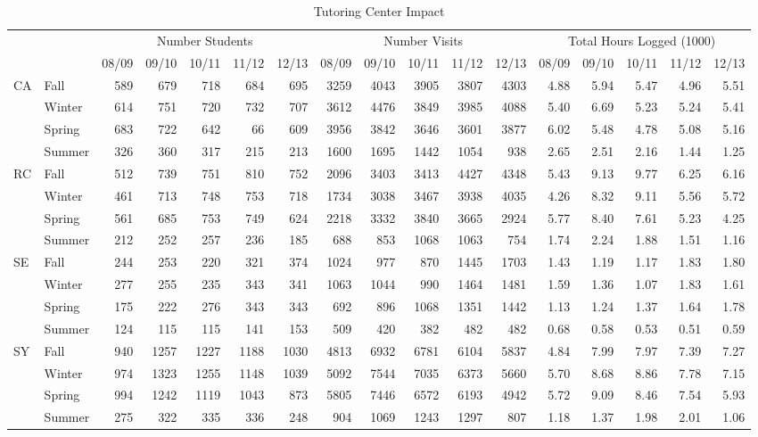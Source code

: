 
\fancyheadoffset[LE,LO]{0cm}

\begin{sidewaystable}[!h]
\centering
\begin{tabular}{llrrrrr|rrrrr|rrrrr}
\toprule
&&\multicolumn{5}{c|}{Number Students}&\multicolumn{5}{c|}{Number Visits}&\multicolumn{5}{c}{Total Hours Logged (1000)}\\
&& 08/09 & 09/10 & 10/11 & 11/12 & 12/13 & 08/09 & 09/10 & 10/11 & 11/12 & 12/13 & 08/09 & 09/10 & 10/11 & 11/12 & 12/13\\
\midrule
\multirow{4}{*}{CA}		&Fall&		589	&679	&718	&684	&695&	3259&4043&3905&3807&	4303&	4.88&5.94&5.47&4.96&5.51\\
					&Winter&		614	&751	&720	&732	&707&	3612&4476&3849&3985&	4088&	5.40&6.69&5.23&5.24&5.41\\
					&Spring&		683	&722&642&66&609&	3956&3842&3646&3601&	3877&	6.02&5.48&4.78&5.08&5.16\\
					&Summer&	326	&360&317&215&213&	1600&1695&1442&1054&	938&		2.65&2.51&2.16&1.44&1.25\\
\midrule
\multirow{4}{*}{RC}		&Fall&		512&	739&	751&	810&	752&		2096&3403&3413&4427&	4348&	5.43&9.13&9.77&6.25&6.16\\
					&Winter&		461&	713&	748&	753&	718&		1734&3038&3467&3938&	4035&	4.26&8.32&9.11&5.56&5.72\\
					&Spring&		561&	685&	753&	749&	624&		2218&3332&3840&3665&	2924&	5.77&8.40&7.61&5.23&4.25\\
					&Summer&	212&	252&	257&	236&	185&		688&	853&	1068&1063&	754&		1.74&2.24&1.88&1.51&1.16\\
\midrule
\multirow{4}{*}{SE}		&Fall	&		244&	253&	220&	321&	374&		1024&977&870&1445&	1703&	1.43&1.19&1.17&1.83&1.80\\
					&Winter&		277&	255&	235&	343&	341&		1063&1044&990&1464&	1481&	1.59&1.36&1.07&1.83&1.61\\
					&Spring&		175&	222&	276&	343&	343&		692&	896&	1068&1351&	1442&	1.13&1.24&1.37&1.64&1.78\\
					&Summer&	124&	115&	115&	141&	153&		509&	420&	382&	482&482&			0.68&0.58&0.53&0.51&0.59\\
\midrule
\multirow{4}{*}{SY}		&Fall&		940&	1257&1227&1188&1030&	4813&6932&6781&6104&	5837&	4.84&7.99&7.97&7.39&7.27\\
					&Winter&		974&	1323&1255&1148&1039&	5092&7544&7035&6373&	5660&	5.70&8.68&8.86&7.78&7.15\\
					&Spring&		994&	1242&1119&1043&873&	5805&7446&6572&6193&	4942&	5.72&9.09&8.46&7.54&5.93\\
					&Summer&	275&	322&	335&	336&	248&		904&1069&1243&1297&807&		1.18&1.37&1.98&2.01&1.06\\
\bottomrule
\end{tabular}
\caption{Tutoring Center Impact}\label{app:tut:tab:SLC}
\end{sidewaystable}

\restoregeometry
\fancyheadoffset[LE,LO]{3cm}


